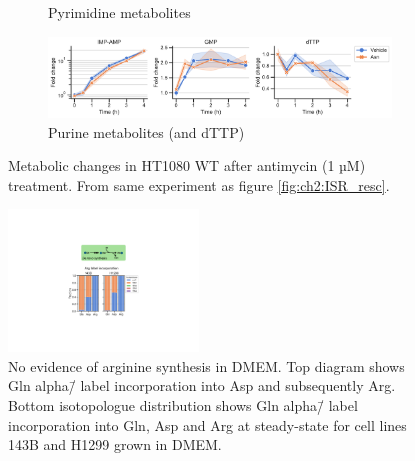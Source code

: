 \begin{figure}[!ht]
\begin{subfigure}[b]{0.9\textwidth}
         \caption{Pyrimidine metabolites}
         \label{fig:app_ch2:HT1080_Anti_pyr}
     \end{subfigure}
     \hfill
     \begin{subfigure}[b]{0.68\textwidth}
         \includegraphics[width=\textwidth]{figures/chap2/app/HT1080_Anti_pur.pdf}
         \caption{Purine metabolites (and dTTP)}
         \label{fig:app_ch2:HT1080_Anti_pur}
     \end{subfigure}
     \hfill
        \caption[Metabolic changes in HT1080 after antimycin treatment]{
        Metabolic changes in HT1080 WT after antimycin (1 µM) treatment.
        From same experiment as figure \ref{fig:ch2:ISR_resc}.
        }
        \label{fig:app_ch2:HT1080_Anti_metab}
\end{figure}



















\begin{figure}
    \centering
    \includegraphics[width=0.45\textwidth]{figures/chap2/app/arg_syn.pdf}
    \caption[No evidence of arginine synthesis in DMEM]{
    No evidence of arginine synthesis in DMEM.
    Top diagram shows Gln alpha\=/\hNi{} label incorporation into Asp and subsequently Arg.
    Bottom isotopologue distribution shows Gln alpha\=/\hNi{} label incorporation into Gln, Asp and Arg at steady-state for cell lines 143B and H1299 grown in DMEM.
    }
    \label{fig:app_ch2:arg_syn}
\end{figure}










